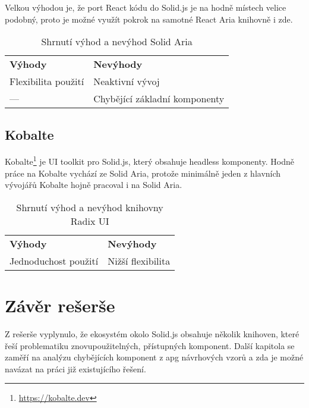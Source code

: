 Velkou výhodou je, že port React kódu do Solid.js je na hodně místech velice podobný, proto je možné využít pokrok na samotné React Aria knihovně i zde.

\begin{table}[ht]
    \begin{ctucolortab}
        \begin{tabularx}{\textwidth}{Y Y}
            \bfseries \textcolor{OK}{Výhody} & \bfseries \textcolor{NOT_OK}{Nevýhody} \\\Midrule{}
            Flexibilita použití              & Neaktivní vývoj                        \\
            ---                              & Chybějící základní komponenty
        \end{tabularx}
    \end{ctucolortab}
    \caption{Shrnutí výhod a nevýhod Solid Aria}
\end{table}

\subsection{Kobalte}

Kobalte\footnote{\url{https://kobalte.dev}} je UI toolkit pro Solid.js, který obsahuje headless komponenty.
Hodně práce na Kobalte vychází ze Solid Aria, protože minimálně jeden z hlavních vývojářů Kobalte hojně pracoval i na Solid Aria.

\begin{table}[ht]
    \begin{ctucolortab}
        \begin{tabularx}{\textwidth}{Y Y}
            \bfseries \textcolor{OK}{Výhody} & \bfseries \textcolor{NOT_OK}{Nevýhody} \\\Midrule{}
            Jednoduchost použití             & Nižší flexibilita
        \end{tabularx}
    \end{ctucolortab}
    \caption{Shrnutí výhod a nevýhod knihovny Radix UI}
\end{table}

\section{Závěr rešerše}

Z rešerše vyplynulo, že ekosystém okolo Solid.js obsahuje několik knihoven, které řeší problematiku znovupoužitelných, přístupných komponent.
Další kapitola se zaměří na analýzu chybějících komponent z \gls{apg} návrhových vzorů a zda je možné navázat na práci již existujícího řešení.
